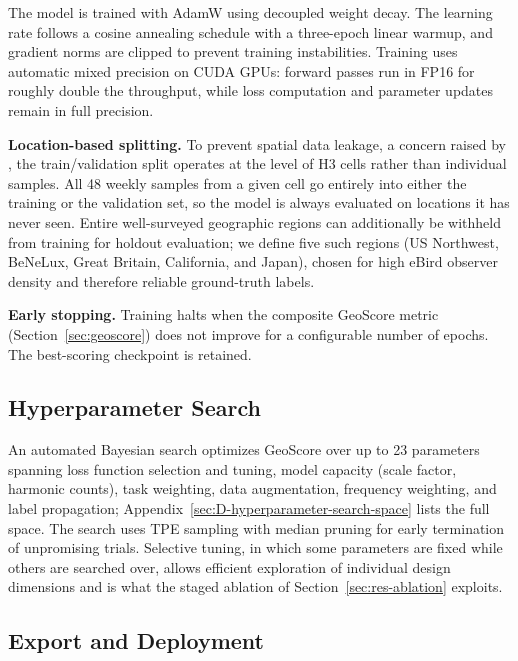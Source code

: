 The model is trained with AdamW \citep{loshchilov2019decoupled} using decoupled weight decay. The learning rate follows a cosine annealing schedule with a three-epoch linear warmup, and gradient norms are clipped to prevent training instabilities. Training uses automatic mixed precision on CUDA GPUs: forward passes run in FP16 for roughly double the throughput, while loss computation and parameter updates remain in full precision.

\textbf{Location-based splitting.} To prevent spatial data leakage, a concern raised by \citet{kellenberger2026performance}, the train/validation split operates at the level of H3 cells rather than individual samples. All 48 weekly samples from a given cell go entirely into either the training or the validation set, so the model is always evaluated on locations it has never seen. Entire well-surveyed geographic regions can additionally be withheld from training for holdout evaluation; we define five such regions (US Northwest, BeNeLux, Great Britain, California, and Japan), chosen for high eBird observer density and therefore reliable ground-truth labels.

\textbf{Early stopping.} Training halts when the composite GeoScore metric (Section~\ref{sec:geoscore}) does not improve for a configurable number of epochs. The best-scoring checkpoint is retained.

\subsection{Hyperparameter Search}
\label{sec:search}

An automated Bayesian search \citep{akiba2019optuna} optimizes GeoScore over up to 23 parameters spanning loss function selection and tuning, model capacity (scale factor, harmonic counts), task weighting, data augmentation, frequency weighting, and label propagation; Appendix~\ref{sec:D-hyperparameter-search-space} lists the full space. The search uses TPE sampling with median pruning for early termination of unpromising trials. Selective tuning, in which some parameters are fixed while others are searched over, allows efficient exploration of individual design dimensions and is what the staged ablation of Section~\ref{sec:res-ablation} exploits.

\subsection{Export and Deployment}
\label{sec:export}

